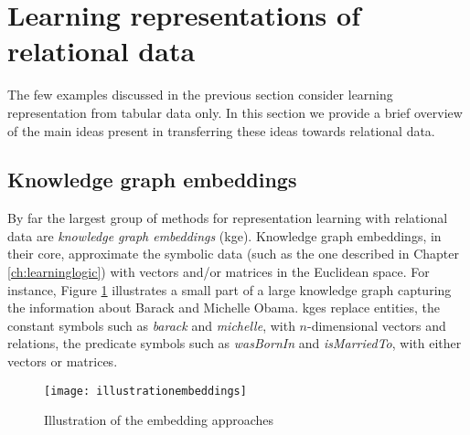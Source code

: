 \section{Learning representations of relational data}


The few examples discussed in the previous section consider learning representation from tabular data only.
In this section we provide a brief overview of the main ideas present in transferring these ideas towards relational data.


\subsection{Knowledge graph embeddings}


By far the largest group of methods for representation learning with relational data are \textit{knowledge graph embeddings} (\gls{kge}).
Knowledge graph embeddings, in their core, approximate the symbolic data (such as the one described in Chapter \ref{ch:learninglogic}) with vectors and/or matrices in the Euclidean space.
For instance, Figure \ref{fig:emb} illustrates a small part of a large knowledge graph capturing the information about Barack and Michelle Obama.
\gls{kge}s replace entities, the constant symbols such as \textit{barack} and \textit{michelle}, with $n$-dimensional vectors and relations, the predicate symbols such as \textit{wasBornIn} and \textit{isMarriedTo}, with either vectors or matrices.

 \begin{figure}
	\centering
	\texttt{[image: illustrationembeddings]}
	\caption{Illustration of the embedding approaches}
	\label{fig:emb}
\end{figure}




